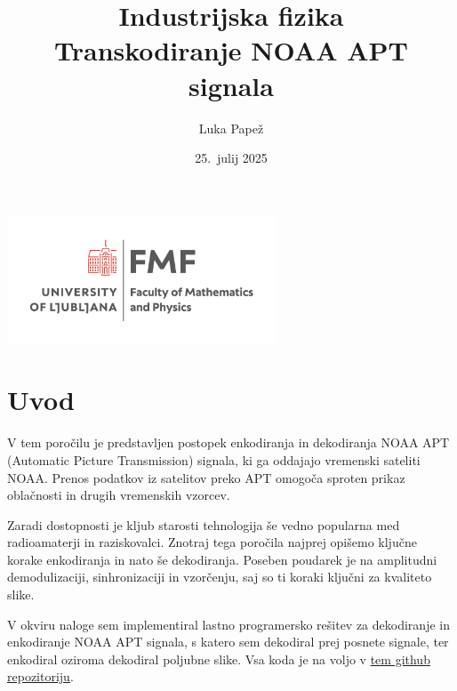 \documentclass{article}
\begin{document}
\title{Industrijska fizika \\[3mm] \large Transkodiranje NOAA APT signala}
\author{Luka Papež}
\date{25.\ julij 2025}

\begin{center}
    \includegraphics[width=8cm]{logo-fmf.png}
\end{center}

{
    \let\newpage\relax
    \maketitle
}

\newpage
\section{Uvod}
V tem poročilu je predstavljen postopek enkodiranja in dekodiranja NOAA APT (Automatic Picture Transmission) signala, ki ga oddajajo vremenski sateliti NOAA. Prenos podatkov iz satelitov preko APT omogoča sproten prikaz oblačnosti in drugih vremenskih vzorcev.

Zaradi dostopnosti je kljub starosti tehnologija še vedno popularna med radioamaterji in raziskovalci. Znotraj tega poročila najprej opišemo ključne korake enkodiranja in nato še dekodiranja. Poseben poudarek je na amplitudni demodulizaciji, sinhronizaciji in vzorčenju, saj so ti koraki ključni za kvaliteto slike.

V okviru naloge sem implementiral lastno programersko rešitev za dekodiranje in enkodiranje NOAA APT signala, s katero sem dekodiral prej posnete signale, ter enkodiral oziroma dekodiral poljubne slike. Vsa koda je na voljo v \href{https://github.com/NotNotLuka/NOAA-APT}{tem github repozitoriju}.
\end{document}
